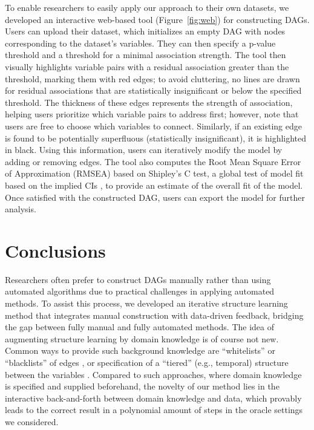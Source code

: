 \documentclass[accepted]{uai2025} %
\begin{document}
To enable researchers to easily apply our approach to their own datasets, we
developed an interactive web-based tool (Figure~\ref{fig:web}) for constructing
DAGs. Users can upload their dataset, which initializes an empty DAG with nodes
corresponding to the dataset's variables. They can then specify a p-value
threshold and a threshold for a minimal association strength. The tool 
then visually highlights variable pairs
with a residual association greater than the threshold, marking them with red
edges; to avoid cluttering, no lines are drawn for residual associations that
are statistically insignificant or below the specified threshold.
The thickness of these edges represents the strength of association,
helping users prioritize which variable pairs to address first; however, note that
users are free to choose which variables to connect. Similarly, if
an existing edge is found to be potentially superfluous (statistically insignificant),
it is highlighted in black. Using this information, users can iteratively
modify the model by adding or removing edges. The tool also computes the Root
Mean Square Error of Approximation (RMSEA) based on Shipley's C test, a global test 
of model fit based on the implied CIs \citep{Shipley2000}, to provide an estimate of the
overall fit of the model. Once satisfied with the constructed DAG, users can
export the model for further analysis.

\section{Conclusions}

Researchers often prefer to construct DAGs manually rather than using automated
algorithms due to practical challenges in applying automated methods. To assist
this process, we developed an iterative structure learning method that
integrates manual construction with data-driven feedback, bridging
the gap between fully manual and fully automated methods.
The idea of augmenting structure learning by domain knowledge is of course not 
new. Common ways to provide such background knowledge are ``whitelists'' or 
``blacklists'' of edges 
\citep{scutari2010}, or specification
of a ``tiered'' (e.g., temporal) structure between the variables \citep{Bang2023}.
Compared to such approaches, where domain knowledge 
is specified and supplied beforehand, the novelty 
of our method lies in the interactive
back-and-forth between domain knowledge and data, 
which provably leads to the correct
result in a polynomial amount of steps in the oracle settings we considered.
\end{document}

